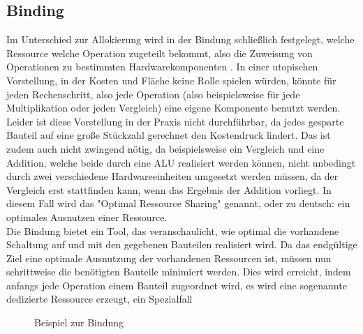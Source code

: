 \documentclass[conference]{IEEEtran}
\begin{document}
\subsection{Binding}
Im Unterschied zur Allokierung wird in der Bindung schließlich festgelegt, welche Ressource welche Operation zugeteilt bekommt, also die Zuweisung von Operationen zu bestimmten Hardwarekomponenten \cite{3}. In einer utopischen Vorstellung, in der Kosten und Fläche keine Rolle spielen würden, könnte für jeden Rechenschritt, also jede Operation (also beispielsweise für jede Multiplikation oder jeden Vergleich) eine eigene Komponente benutzt werden. Leider ist diese Vorstellung in der Praxis nicht durchführbar, da jedes gesparte Bauteil auf eine große Stückzahl gerechnet den Kostendruck lindert. Das ist zudem auch nicht zwingend nötig, da beispielsweise ein Vergleich und eine Addition, welche beide durch eine ALU realisiert werden können, nicht unbedingt durch zwei verschiedene Hardwareeinheiten umgesetzt werden müssen, da der Vergleich erst stattfinden kann, wenn das Ergebnis der Addition vorliegt. In diesem Fall wird das "Optimal Ressource Sharing" genannt, oder zu deutsch: ein optimales Ausnutzen einer Ressource\cite{2}.\\
Die Bindung bietet ein Tool, das veranschaulicht, wie optimal die vorhandene Schaltung auf und mit den gegebenen Bauteilen realisiert wird. Da das endgültige Ziel eine optimale Ausnutzung der vorhandenen Ressourcen ist, müssen nun schrittweise die benötigten Bauteile minimiert werden. Dies wird erreicht, indem anfangs jede Operation einem Bauteil zugeordnet wird, es wird eine sogenannte dedizierte Ressource erzeugt, ein Spezialfall \cite[S. 150]{3} 
\begin{figure}[h]
\caption{Beispiel zur Bindung}
\label{fig.1}
\end{figure} 
\end{document}
